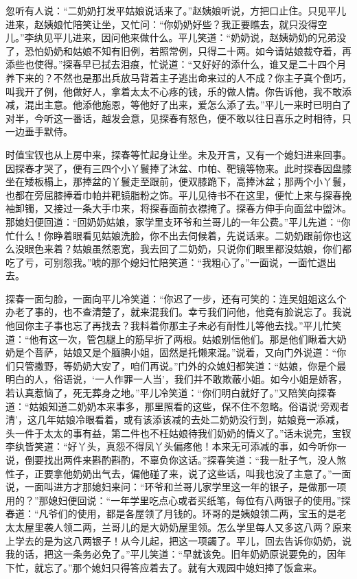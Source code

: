 忽听有人说：“二奶奶打发平姑娘说话来了。”赵姨娘听说，方把口止住。只见平儿进来，赵姨娘忙陪笑让坐，又忙问：“你奶奶好些？我正要瞧去，就只没得空儿。”李纨见平儿进来，因问他来做什么。平儿笑道：“奶奶说，赵姨奶奶的兄弟没了，恐怕奶奶和姑娘不知有旧例，若照常例，只得二十两。如今请姑娘裁夺着，再添些也使得。”探春早已拭去泪痕，忙说道：“又好好的添什么，谁又是二十四个月养下来的？不然也是那出兵放马背着主子逃出命来过的人不成？你主子真个倒巧，叫我开了例，他做好人，拿着太太不心疼的钱，乐的做人情。你告诉他，我不敢添减，混出主意。他添他施恩，等他好了出来，爱怎么添了去。”平儿一来时已明白了对半，今听这一番话，越发会意，见探春有怒色，便不敢以往日喜乐之时相待，只一边垂手默侍。

时值宝钗也从上房中来，探春等忙起身让坐。未及开言，又有一个媳妇进来回事。因探春才哭了，便有三四个小丫鬟捧了沐盆、巾帕、靶镜等物来。此时探春因盘膝坐在矮板榻上，那捧盆的丫鬟走至跟前，便双膝跪下，高捧沐盆；那两个小丫鬟，也都在旁屈膝捧着巾帕并靶镜脂粉之饰。平儿见待书不在这里，便忙上来与探春挽袖卸镯，又接过一条大手巾来，将探春面前衣襟掩了。探春方伸手向面盆中盥沐。那媳妇便回道：“回奶奶姑娘，家学里支环爷和兰哥儿的一年公费。”平儿先道：“你忙什么！你睁着眼看见姑娘洗脸，你不出去伺候着，先说话来。二奶奶跟前你也这么没眼色来着？姑娘虽然恩宽，我去回了二奶奶，只说你们眼里都没姑娘，你们都吃了亏，可别怨我。”唬的那个媳妇忙陪笑道：“我粗心了。”一面说，一面忙退出去。

探春一面匀脸，一面向平儿冷笑道：“你迟了一步，还有可笑的：连吴姐姐这么个办老了事的，也不查清楚了，就来混我们。幸亏我们问他，他竟有脸说忘了。我说他回你主子事也忘了再找去？我料着你那主子未必有耐性儿等他去找。”平儿忙笑道：“他有这一次，管包腿上的筋早折了两根。姑娘别信他们。那是他们瞅着大奶奶是个菩萨，姑娘又是个腼腆小姐，固然是托懒来混。”说着，又向门外说道：“你们只管撒野，等奶奶大安了，咱们再说。”门外的众媳妇都笑道：“姑娘，你是个最明白的人，俗语说，‘一人作罪一人当’，我们并不敢欺蔽小姐。如今小姐是娇客，若认真惹恼了，死无葬身之地。”平儿冷笑道：“你们明白就好了。”又陪笑向探春道：“姑娘知道二奶奶本来事多，那里照看的这些，保不住不忽略。俗语说‘旁观者清’，这几年姑娘冷眼看着，或有该添该减的去处二奶奶没行到，姑娘竟一添减，头一件于太太的事有益，第二件也不枉姑娘待我们奶奶的情义了。”话未说完，宝钗李纨皆笑道：“好丫头，真怨不得凤丫头偏疼他！本来无可添减的事，如今听你一说，倒要找出两件来斟酌斟酌，不辜负你这话。”探春笑道：“我一肚子气，没人煞性子，正要拿他奶奶出气去，偏他碰了来，说了这些话，叫我也没了主意了。”一面说，一面叫进方才那媳妇来问：“环爷和兰哥儿家学里这一年的银子，是做那一项用的？”那媳妇便回说：“一年学里吃点心或者买纸笔，每位有八两银子的使用。”探春道：“凡爷们的使用，都是各屋领了月钱的。环哥的是姨娘领二两，宝玉的是老太太屋里袭人领二两，兰哥儿的是大奶奶屋里领。怎么学里每人又多这八两？原来上学去的是为这八两银子！从今儿起，把这一项蠲了。平儿，回去告诉你奶奶，说我的话，把这一条务必免了。”平儿笑道：“早就该免。旧年奶奶原说要免的，因年下忙，就忘了。”那个媳妇只得答应着去了。就有大观园中媳妇捧了饭盒来。


